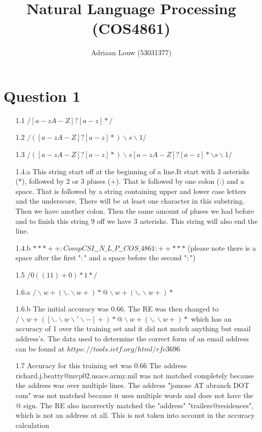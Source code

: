 \documentclass[10pt,a4paper]{article}
\title{Natural Language Processing (COS4861)}
\author{Adriaan Louw (53031377)}
\begin{document}
\maketitle

\section{Question 1}
\begin{enumerate}[leftmargin=\labelsep]
\item[1.1]$/[a-zA-Z]?[a-z]*/$

\item[1.2]$/([a-zA-Z]?[a-z]*)\backslash s \backslash 1/$

\item[1.3]$/([a-zA-Z]?[a-z]*)\backslash s [a-zA-Z]?[a-z]* \backslash s \backslash 1/$

\item[1.4.a]This string start off at the beginning of a line.It start with 3 asterisks (*), followed by 2 or 3 pluses (+). That is followed by one colon (:) and a space. That is followed by a string containing upper and lower case letters and the underscore. There will be at least one character in this substring. Then we have another colon. Then the same amount of pluses we had before and to finish this string 9 off we have 3 asterisks. This string will also end the line.

\item[1.4.b] $***++: CompCSI\_\_N\_L\_P\_\_COS\_4861 :++***$ \newline
 (please note there is a space after the first "$:$" and a space before the second "$:$")

\item[1.5] $/0((11)+0)*1*/$

\item[1.6.a] $/\backslash w+(\backslash . \backslash w +)*@ \backslash w+(\backslash . \backslash w +)*$

\item[1.6.b] The initial accuracy was 0.66. \newline
             The RE was then changed to $/\backslash w+([\backslash . \backslash w\backslash ' \backslash -] +)*@ \backslash w+(\backslash . \backslash w +)*$ which has an accuracy of 1 over the training set and it did not match anything but email address's. The data used to determine the correct form of an email address can be found at $https://tools.ietf.org/html/rfc3696$
 
\item[1.7] Accuracy for this training set was 0.66 \newline
 The address richard.j.beatty@mvp02.usace.army.mil was not matched completely because the address was over multiple lines. \newline
 The address "jomose AT abranch DOT com" was not matched because it uses multiple words and does not have the $@$ sign. \newline
 The RE also incorrectly matched the "address" "trailers@residences", which is not an address at all. This is not taken into account in the accuracy calculation      


\end{enumerate}
\end{document}
